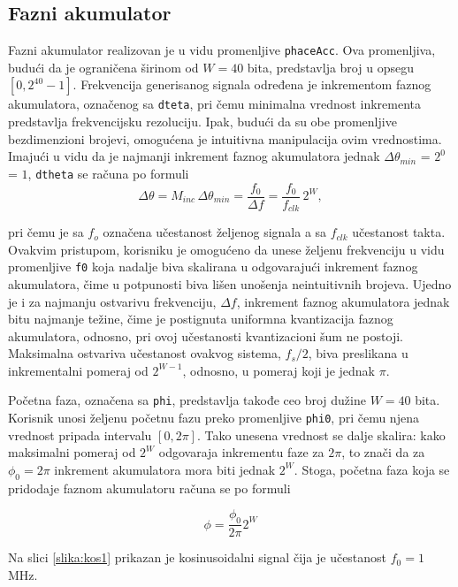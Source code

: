 \documentclass[conference]{IEEEtran}
\begin{document}
\subsection{Fazni akumulator}
Fazni akumulator realizovan je u vidu promenljive \texttt{phaceAcc}. Ova promenljiva, budući da je ograničena širinom od $W=40$ bita, predstavlja broj u opsegu $[0, 2^{40}-1]$. Frekvencija generisanog signala određena je inkrementom faznog akumulatora, označenog sa \texttt{dteta}, pri čemu minimalna vrednost inkrementa predstavlja frekvencijsku rezoluciju. Ipak, budući da su obe promenljive bezdimenzioni brojevi, omogućena je intuitivna manipulacija ovim vrednostima. Imajući u vidu da je najmanji inkrement faznog akumulatora jednak $\Delta \theta_{min}$ = $2^0$ = $1$, \texttt{dtheta} se računa po formuli
\\
\begin{equation}
\Delta \theta = M_{inc}\,\Delta \theta_{min} = \frac{f_0}{\Delta f} = \frac{f_{0}}{f_{clk}}\,2^W ,
\end{equation}

\noindent pri čemu je sa $f_{o}$ označena učestanost željenog signala a sa $f_{clk}$ učestanost takta. Ovakvim pristupom, korisniku je omogućeno da unese željenu frekvenciju u vidu promenljive \texttt{f0} koja nadalje biva skalirana u odgovarajući inkrement faznog akumulatora, čime u potpunosti biva lišen unošenja neintuitivnih brojeva. Ujedno je i  za najmanju ostvarivu frekvenciju, $\Delta f$, inkrement faznog akumulatora jednak bitu najmanje težine, čime je postignuta uniformna kvantizacija faznog akumulatora, odnosno, pri ovoj učestanosti kvantizacioni šum ne postoji. Maksimalna ostvariva učestanost ovakvog sistema, $f_s/2$, biva preslikana u inkrementalni pomeraj od $2^{W-1}$, odnosno, u pomeraj koji je jednak $\pi$.

Početna faza, označena sa \texttt{phi}, predstavlja takođe ceo broj dužine $W=40$ bita. Korisnik unosi željenu početnu fazu preko promenljive \texttt{phi0}, pri čemu njena vrednost pripada intervalu $[0, 2\pi]$. Tako unesena vrednost se dalje skalira: kako maksimalni pomeraj od $2^W$ odgovaraja inkrementu faze za $2\pi$, to znači da za $\phi_0 = 2\pi$ inkrement akumulatora mora biti jednak $2^W$. Stoga, početna faza koja se pridodaje faznom akumulatoru računa se po formuli

\begin{equation}
	\phi = \frac{\phi_0}{2\pi} 2^W
\end{equation}

Na slici \ref{slika:kos1} prikazan je kosinusoidalni signal čija je učestanost $f_0 = 1$\, MHz. 
\end{document}
